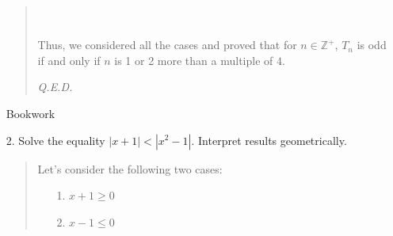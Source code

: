 \documentclass[12pt, a4paper]{article}                      %
\newcommand{\intzp}{\mathbb{Z^+}}
\begin{document}
\begin{itemize}
\begin{quote}
\\\\
Thus, we considered all the cases and proved that for $n \in \intzp$, $T_n$ is odd if and only if $n$ is 1 or 2 more
than a multiple of $4$.
\begin{flushright}
\textit{Q.E.D.}
\end{flushright}
\end{quote}
\newpage
{\large Bookwork}
\item[2.]
Solve the equality $|x + 1| < |x^2 - 1|$. Interpret results geometrically.
\begin{quote}
Let's consider the following two cases:\\
\begin{itemize}
\item[1.]
$x + 1 \geq 0$
\item[2.]
$x - 1 \leq 0$
\\
\end{itemize}


\end{quote}
\end{itemize}
\end{document}
